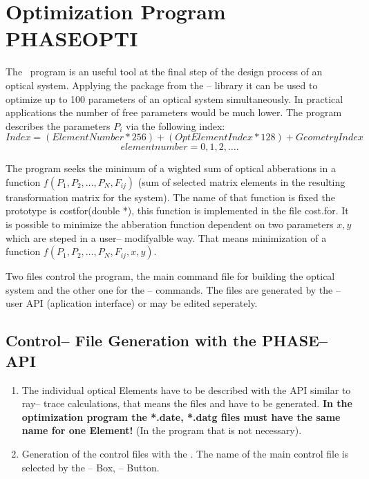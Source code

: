 


\chapter{Optimization Program PHASEOPTI}   
The \phaseopti ~program is an useful tool at the final step of the
design process of an optical system. Applying the \minuit package from
the \cern-- library \cite {MINUIT} it can be used to optimize up to
100 parameters of an optical system simultaneously. In practical
applications the number of free parameters would be much lower. The
program describes the parameters $P_i$ via the following index:
\[ Index= (ElementNumber * 256) + (OptElementIndex * 128) + GeometryIndex \] 
\[ elementnumber = 0, 1, 2, \ldots .\]

The program seeks the minimum of a wighted sum of optical abberations
in a function \mbox {} $f(P_1, P_2,\ldots, P_N, F_{ij})$ (sum of
selected matrix elements in the resulting transformation matrix for
the system). The name of that function is fixed the prototype is \prog
{costfor(double *)}, this function is implemented in the file \prog
{cost.for}. It is possible to minimize the abberation function
dependent on two parameters $x, y$ which are steped in a user--
modifyalble way. That means minimization of a function $f(P_1,
P_2,\ldots, P_N, F_{ij}, x, y)$.

Two files control the program, the main command file for building the
optical system and the other one for the \minuit -- commands.  The
files are generated by the \phase-- user API (aplication interface) or
may be edited seperately.

\section{Control-- File Generation with the PHASE-- API}
\begin{enumerate}
\item The individual optical Elements have to be described with the
\phase API similar to ray-- trace calculations, that means the files
 and  have to be
generated.  {\bf In the optimization program the *.date, *.datg files
must have the same name for one Element!} (In the \phase program that
is not necessary).
\item Generation of the control files with the .
The name of the main control file  is selected by the 
-- Box, -- Button. 
\end {enumerate}         

